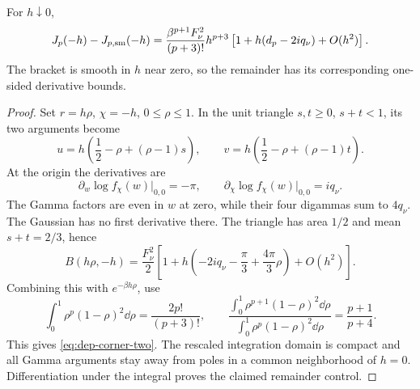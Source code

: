 \begin{lemma}
For $h\downarrow0$,
\begin{equation}
 J_p(-h)-J_{p,\rm sm}(-h)
 =\frac{\beta^{p+1}F_\nu^2}{(p+3)!}h^{p+3}
       \left[1+h(d_p-2iq_\nu)+O(h^2)\right].
 \label{eq:dep-corner-two}
\end{equation}
The bracket is smooth in $h$ near zero, so the remainder has its
corresponding one-sided derivative bounds.
\end{lemma}
\begin{proof}
Set $r=h\rho$, $\chi=-h$, $0\le\rho\le1$. In the unit triangle
$s,t\ge0$, $s+t<1$, its two arguments become
\[
 u=h\left(\frac12-\rho+(\rho-1)s\right),\qquad
 v=h\left(\frac12-\rho+(\rho-1)t\right).
\]
At the origin the derivatives are
\begin{equation}
 \partial_w\log f_\chi(w)\big|_{0,0}=-\pi,\qquad
 \partial_\chi\log f_\chi(w)\big|_{0,0}=iq_\nu.
 \label{eq:dep-derivatives}
\end{equation}
The Gamma factors are even in $w$ at zero, while their four digammas
sum to $4q_\nu$. The Gaussian has no first derivative there.
The triangle has area $1/2$ and mean $s+t=2/3$, hence
\[
 B(h\rho,-h)=\frac{F_\nu^2}{2}
 \left[1+h\left(-2iq_\nu-\frac\pi3+\frac{4\pi}3\rho\right)
       +O(h^2)\right].
\]
Combining this with $e^{-\beta h\rho}$, use
\[
 \int_0^1\rho^p(1-\rho)^2\dd\rho
 =\frac{2p!}{(p+3)!},\qquad
 \frac{\int_0^1\rho^{p+1}(1-\rho)^2\dd\rho}
      {\int_0^1\rho^p(1-\rho)^2\dd\rho}=\frac{p+1}{p+4}.
\]
This gives \eqref{eq:dep-corner-two}. The rescaled integration domain
is compact and all Gamma arguments stay away from poles in a common
neighborhood of $h=0$. Differentiation under the integral proves the
claimed remainder control.
\end{proof}

